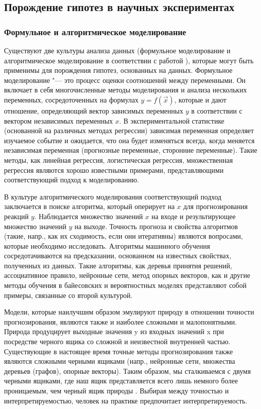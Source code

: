 \subsection{Порождение гипотез в научных экспериментах}\label{sect1_2_5}
\subsubsection{Формульное и алгоритмическое моделирование}\label{sect1_2_5_1}
Существуют две культуры анализа данных (формульное моделирование  и алгоритмическое моделирование в соответствии с 
работой \cite{breiman2001statistical}), которые могут быть применимы для порождения гипотез, основанных на данных. 
Формульное моделирование "--- это процесс оценки соотношений между переменными. Он включает в себя многочисленные методы 
моделирования и анализа нескольких переменных, сосредоточенных на формулах $y = f\left(\Vec{x}\right)$, которые и дают 
отношение, определяющий вектор зависимых переменных $y$ в соответствии с вектором независимых переменных $x$. 
В экспериментальной статистике (основанной на различных методах регрессии) зависимая переменная определяет изучаемое 
событие и ожидается, что она будет изменяться всегда, когда меняется независимая переменная (прогнозные переменные, 
сторонние переменные). Такие методы, как линейная регрессия, логистическая регрессия, множественная регрессия являются 
хорошо известными примерами, представляющими соответствующий подход к моделированию.

В культуре алгоритмического моделирования соответствующий подход заключается в поиске алгоритма, который оперирует 
на $x$ для прогнозирования реакций $y$. Наблюдается множество значений $x$ на входе и результирующее множество 
значений $y$ на выходе. Точность прогноза и свойства алгоритмов (такие, напр., как их сходимость, если они итеративны) 
являются вопросами, которые необходимо исследовать. Алгоритмы машинного обучения сосредотачиваются на предсказании, 
основанном на известных свойствах, полученных из данных. Такие алгоритмы, как деревья принятия решений, ассоциативное 
правило, нейронные сети, метод опорных векторов, как и другие методы обучения в байесовских и вероятностных моделях 
\cite{barber2012bayesian, hastie2009elements} представляют собой примеры, связанные со второй культурой. 

Модели, которые наилучшим образом эмулируют природу в отношении точности прогнозирования, являются также и наиболее 
сложными и малопонятными. Природа продуцирует выходные значения y из входных значений x при посредстве черного ящика 
со сложной и неизвестной внутренней частью. Существующие в настоящее время точные методы прогнозирования также 
являются сложными черными ящиками (напр., нейронные сети, множества деревьев (графов), опорные векторы). Таким образом, 
мы сталкиваемся с двумя черными ящиками, где наш ящик представляется всего лишь немного более проницаемым, чем черный 
ящик природы \cite{breiman2001statistical}. Выбирая между точностью и интерпретируемостью, человек на практике 
предпочитает интерпретируемость. 

